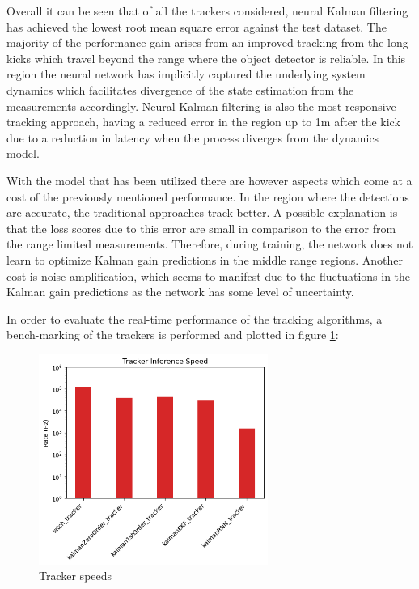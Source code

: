 \documentclass[a4paper,twoside,12pt]{report}
\begin{document}
Overall it can be seen that of all the trackers considered, neural Kalman filtering has achieved the lowest root mean square error against the test dataset. The majority of the performance gain arises from an improved tracking from the long kicks which travel beyond the range where the object detector is reliable. In this region the neural network has implicitly captured the underlying system dynamics which facilitates divergence of the state estimation from the measurements accordingly. Neural Kalman filtering is also the most responsive tracking approach, having a reduced error in the region up to 1m after the kick due to a reduction in latency when the process diverges from the dynamics model. 

With the model that has been utilized there are however aspects which come at a cost of the previously mentioned performance. In the region where the detections are accurate, the traditional approaches track better. A possible explanation is that the loss scores due to this error are small in comparison to the error from the range limited measurements. Therefore, during training, the network does not learn to optimize Kalman gain predictions in the middle range regions. Another cost is noise amplification, which seems to manifest due to the fluctuations in the Kalman gain predictions as the network has some level of uncertainty.

In order to evaluate the real-time performance of the tracking algorithms, a bench-marking of the trackers is performed and plotted in figure \ref{fig:trackspeeds}:

\begin{figure}[h!]
\begin{center}
\includegraphics[width=7.5cm]{images/tracker_speeds.png}
\caption{Tracker speeds}
\label{fig:trackspeeds}
\end{center}
\end{figure}
\end{document}
